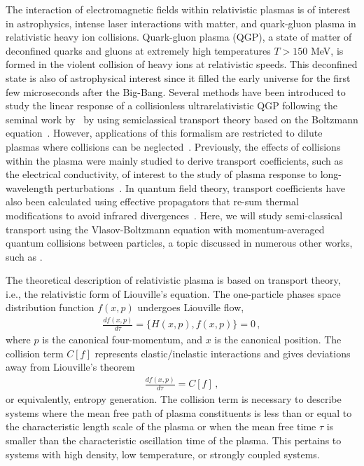 The interaction of electromagnetic fields within relativistic plasmas is of interest in astrophysics, intense laser interactions with matter, and quark-gluon plasma in relativistic heavy ion collisions. Quark-gluon plasma (QGP), a state of matter of deconfined quarks and gluons at extremely high temperatures $T>150$ MeV, is formed in the violent collision of heavy ions at relativistic speeds. This deconfined state is also of astrophysical interest since it filled the early universe for the first few microseconds after the Big-Bang. Several methods have been introduced to study the linear response of a collisionless ultrarelativistic QGP following the seminal work by~\cite{Weldon:1982aq} by using semiclassical transport theory based on the Boltzmann equation~\cite{Mrowczynski:1987jr,Mrowczynski:1989np,Blaizot:1993zk,Kelly:1994ig,Kelly:1994dh}. However, applications of this formalism are restricted to dilute plasmas where collisions can be neglected~\cite{Blaizot:2001nr}. 
Previously, the effects of collisions within the plasma were mainly studied to derive transport coefficients, such as the electrical conductivity, of interest to the study of plasma response to long-wavelength perturbations~\cite{Mrowczynski:1988xu,Heiselberg:1993cr,Ahonen:1996nq,Baym:1997gq,Ahonen:1998iz}. In quantum field theory, transport coefficients have also been calculated using effective propagators that re-sum thermal modifications to avoid infrared divergences~\cite{Heiselberg:1994ms,Arnold:2002zm,Arnold:2003zc}. Here, we will study semi-classical transport using the Vlasov-Boltzmann equation with momentum-averaged quantum collisions between particles, a topic discussed in numerous other works, such as \cite{DeGroot:1980dk,Cercignani:2002bk,Hakim:2011bk,Carrington:2003je,Schenke:2006xu}.


The theoretical description of relativistic plasma is based on transport theory, i.e., the relativistic form of Liouville's equation. The one-particle phases space distribution function $f(x,p)$ undergoes Liouville flow,
\begin{align}
    \frac{d f(x,p)}{d\tau} = \{H(x,p), f(x,p)\} = 0\,,
\end{align}
where $p$ is the canonical four-momentum, and $x$ is the canonical position. The collision term $C[f]$ represents elastic/inelastic interactions and gives deviations away from Liouville's theorem
\begin{align}\label{eq:LpC}
    \frac{d f(x,p)}{d\tau} = C[f]\,,
\end{align}
or equivalently, entropy generation. The collision term is necessary to describe systems where the mean free path of plasma constituents is less than or equal to the characteristic length scale of the plasma or when the mean free time $\tau$ is smaller than the characteristic oscillation time of the plasma. This pertains to systems with high density, low temperature, or strongly coupled systems.

